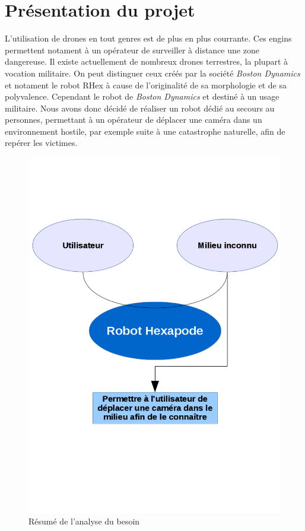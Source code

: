 \documentclass[12pt,french,a4paper]{article}
\begin{document}



\newpage
\tableofcontents
\newpage

\part{Présentation du projet}

L'utilisation de drones en tout genres est de plus en plus courrante. Ces engins permettent notament à un opérateur de surveiller à distance une zone dangereuse. Il existe actuellement de nombreux drones terrestres, la plupart à vocation militaire. On peut distinguer ceux créés par la société \emph{Boston Dynamics} et notament le robot RHex à cause de l'originalité de sa morphologie et de sa polyvalence. Cependant le robot de \emph{Boston Dynamics} et destiné à un usage militaire. Nous avons donc décidé de réaliser un robot dédié au secours au personnes, permettant à un opérateur de déplacer une caméra dans un environnement hostile, par exemple suite à une catastrophe naturelle, afin de repérer les victimes.

\begin{figure}[h!]
	\centering
	\includegraphics[width=\textwidth/2]{images/beteCorne.png}
	\caption[bete a corne]{\label{fig:Bete_corne} Résumé de l'analyse du besoin}
\end{figure}
\end{document}
